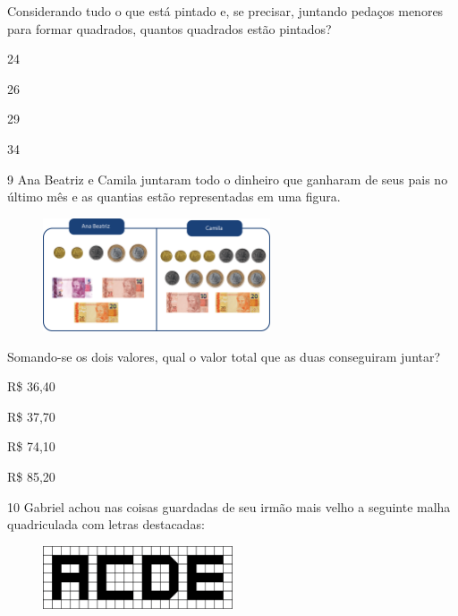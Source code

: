 Considerando tudo o que está pintado e, se precisar, juntando pedaços
menores para formar quadrados, quantos quadrados estão pintados?

\begin{escolha}
\item
  24
\item
  26
\item
  29
\item
  34
\end{escolha}

\pagebreak
\num{9} Ana Beatriz e Camila juntaram todo o dinheiro que ganharam de seus pais no
último mês e as quantias estão representadas em uma figura.

\begin{figure}[htpb!]
\centering
\includegraphics[width=0.6\textwidth]{./media/image95.png}
\end{figure}

Somando-se os dois valores, qual o valor total que as duas conseguiram juntar?

\begin{multicols}{2}
\begin{escolha}
\item
  R\$ 36,40
\item
  R\$ 37,70
\item
  R\$ 74,10
\item
  R\$ 85,20
\end{escolha}
\end{multicols}

\num{10} Gabriel achou nas coisas guardadas de seu irmão mais velho a seguinte malha quadriculada com letras destacadas:

\begin{figure}[htpb!]
\centering
\includegraphics[width=0.5\textwidth]{./media/image96.png}
\end{figure}

